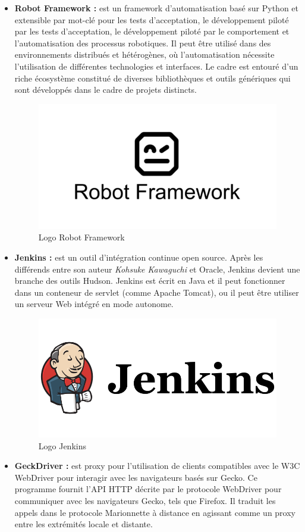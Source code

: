\begin{itemize}
	\item \textbf{Robot Framework\cite{robotframework} :} est un framework d'automatisation basé sur Python et extensible par mot-clé pour les tests d'acceptation, le développement piloté par les tests d'acceptation, le développement piloté par le comportement et l'automatisation des processus robotiques. Il peut être utilisé dans des environnements distribués et hétérogènes, où l'automatisation nécessite l'utilisation de différentes technologies et interfaces. Le cadre est entouré d'un riche écosystème constitué de diverses bibliothèques et outils génériques qui sont développés dans le cadre de projets distincts.
	\begin{figure}[H]
		\centering
		\includegraphics[width=0.4\linewidth]{img/logos/robot-framework}
		\caption[Logo Robot Framework]{Logo Robot Framework}
		\label{fig:robot-framework}
	\end{figure}
	\item \textbf{Jenkins\cite{jenkins} :} est un outil d'intégration continue open source. Après les différends entre son auteur \textit{Kohsuke Kawaguchi} et Oracle, Jenkins devient une branche des outils Hudson. Jenkins est écrit en Java et il peut fonctionner dans un conteneur de servlet (comme Apache Tomcat), ou il peut être utiliser un serveur Web intégré en mode autonome.
	\begin{figure}[H]
		\centering
		\includegraphics[width=0.3\linewidth]{img/logos/jenkins}
		\caption[Logo Jenkins]{Logo Jenkins}
		\label{fig:jenkins}
	\end{figure}
	\item \textbf{GeckDriver\cite{geckodrive} :} est proxy pour l'utilisation de clients compatibles avec le W3C WebDriver pour interagir avec les navigateurs basés sur Gecko. Ce programme fournit l'API HTTP décrite par le protocole WebDriver pour communiquer avec les navigateurs Gecko, tels que Firefox. Il traduit les appels dans le protocole Marionnette à distance en agissant comme un proxy entre les extrémités locale et distante.

\end{itemize}

